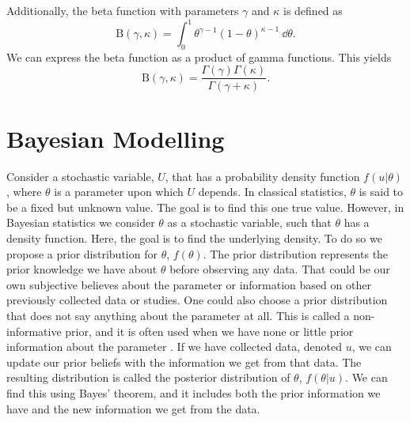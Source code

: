 Additionally, the beta function with parameters $\gamma$ and $\kappa$ is defined as
\begin{equation}
\label{beta_function}
    \mathrm{B}(\gamma,\kappa) = \int_0^1 \theta^{\gamma-1}(1-\theta)^{\kappa-1} \: \dd \theta.
\end{equation}
We can express the beta function as a product of gamma functions. This yields
\begin{equation}
\label{beta_as_gamma}
    \mathrm{B}(\gamma,\kappa) = \frac{\Gamma(\gamma)\Gamma(\kappa)}{\Gamma(\gamma+\kappa)}.
\end{equation}



\section{Bayesian Modelling}
\label{theory_bayesian_modelling}
Consider a stochastic variable, $U$, that has a probability density function $f(u|\theta)$, where $\theta$ is a parameter upon which $U$ depends. In classical statistics, $\theta$ is said to be a fixed but unknown value. The goal is to find this one true value. 
However, in Bayesian statistics we consider $\theta$ as a stochastic variable, such that $\theta$ has a density function. 
Here, the goal is to find the underlying density. To do so we propose a prior distribution for $\theta$, $f(\theta)$. The prior distribution represents the prior knowledge we have about $\theta$ before observing any data. That could be our own subjective believes about the parameter or information based on other previously collected data or studies. One could also choose a prior distribution that does not say anything about the parameter at all. This is called a non-informative prior, and it is often used when we have none or little prior information about the parameter \citep{givens2012computational}. 
If we have collected data, denoted $u$, we can update our prior beliefs with the information we get from that data. The resulting distribution is called the posterior distribution of $\theta$, $f(\theta|u)$. We can find this using Bayes' theorem, and it includes both the prior information we have and the new information we get from the data. 

